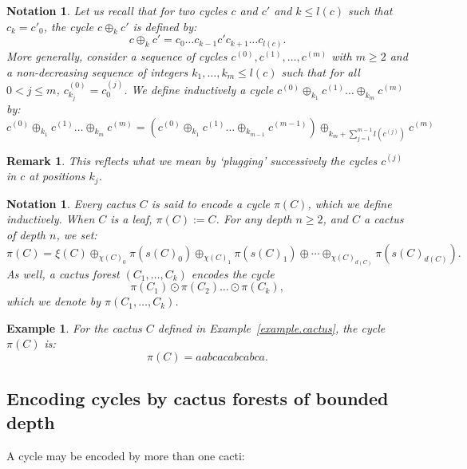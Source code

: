 \documentclass{article}
\newtheorem{example}[theorem]{Example}
\newtheorem{notation}[theorem]{Notation}
\newtheorem{remark}[theorem]{Remark}
\begin{document}
\begin{notation}
Let us recall that for two cycles $c$ and $c'$ and $k \le l(c)$ such that $c_k = c'_0$, the cycle $c {\oplus}_{k} c'$ is defined by:
\[c {\oplus}_{k} c' = c_0 \hdots c_{k-1} c' c_{k+1} \hdots c_{l(c)}.\]
More generally, consider a sequence of cycles $c^{(0)}, c^{(1)}, \dots ,c^{(m)}$ with $m \ge 2$ and a non-decreasing sequence of integers $k_1, \dots , k_m \le l(c)$ such that for all $0 < j \le m$, 
$c^{(0)}_{k_j} = c^{(j)}_{0}$. We define inductively a cycle 
$c^{(0)} \oplus_{k_1} c^{(1)} \ldots \oplus_{k_m} c^{(m)}$ by:
\[c^{(0)} \oplus_{k_1} c^{(1)} \ldots \oplus_{k_m} c^{(m)} = (c^{(0)} \oplus_{k_1} c^{(1)} \ldots \oplus_{k_{m-1}} c^{(m-1)}) \oplus_{k_m+\sum_{j=1}^{m-1} l(c^{(j)})} c^{(m)}\]
\end{notation}

\begin{remark}
This reflects what we mean by `plugging' successively the cycles $c^{(j)}$ in $c$ at positions $k_j$. 
\end{remark}

\begin{notation}Every cactus $C$ is said to \emph{encode} a cycle $\pi(C)$, which we define inductively.
When $C$ is a leaf, $\pi(C) := C$. For any depth $n \ge2$, and $C$ a cactus of depth $n$, we set: 
\[\pi(C) = \xi(C)\oplus_{\chi(C)_0}\pi(s(C)_0) \oplus_{\chi(C)_1}\pi(s(C)_1)\oplus\cdots \oplus_{\chi(C)_{d(C)}}\pi(s(C)_{d(C)}).
\]
As well, a cactus forest $(C_1,\ldots,C_k)$ encodes the 
cycle \[\pi(C_1) \odot \pi(C_2) \ldots \odot \pi(C_k),\]
which we denote by $\pi(C_1,\ldots,C_k)$.
\end{notation}

\begin{example}
For the cactus $C$ defined in Example~\ref{example.cactus}, the cycle $\pi(C)$ is: 
\[\pi(C) = aabcacabcabca.\]
\end{example}

\subsection{Encoding cycles by cactus forests of bounded depth\label{section.bounded.depth}}

A cycle may be encoded by more than one cacti:
\end{document}
